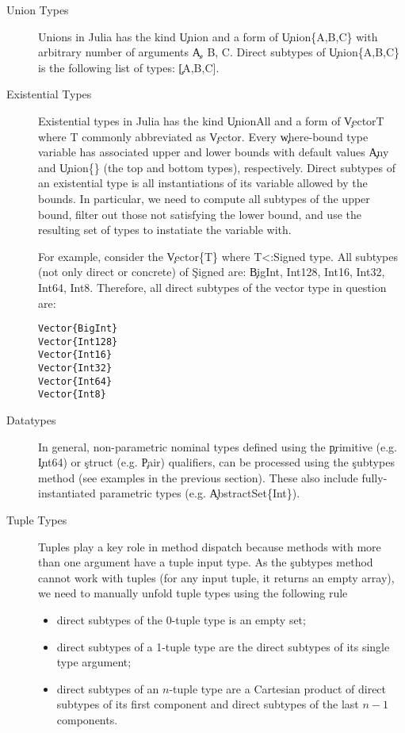 \begin{description}

  \item[Union Types]
        Unions in Julia has the kind \c{Union} and a form of \c{Union\{A,B,C\}}
        with arbitrary number of arguments \c{A, B, C}.
        Direct subtypes of \c{Union\{A,B,C\}} is the following list of types: \c{[A,B,C]}.

  \item[Existential Types]
        Existential types in Julia has the kind \c{UnionAll} and a form of
        \c{Vector{T} where T} commonly abbreviated as \c{Vector}. Every
        \c{where}-bound type variable has associated upper and lower bounds with
        default values \c{Any} and \c{Union\{\}} (the top and bottom types),
        respectively. Direct subtypes of an existential type is all
        instantiations of its variable allowed by the bounds. In particular, we
        need to compute all subtypes of the upper bound, filter out those not
        satisfying the lower bound, and use the resulting set of types to
        instatiate the variable with.

        For example, consider the \c{Vector\{T\} where T<:Signed} type.
        All subtypes (not only direct or concrete) of \c{Signed} are: \c{BigInt, Int128, Int16, Int32, Int64, Int8}. Therefore, all direct subtypes of the vector type in question are:

\begin{minipage}{.92\textwidth}
        \begin{lstlisting}
Vector{BigInt}
Vector{Int128}
Vector{Int16}
Vector{Int32}
Vector{Int64}
Vector{Int8}
        \end{lstlisting}
\end{minipage}

  \item[Datatypes]
        In general, non-parametric nominal types defined using the \c{primitive} (e.g. \c{Int64}) or
        \c{struct} (e.g. \c{Pair}) qualifiers,  can be processed
        using the \c{subtypes} method (see examples in the previous section).%
        These also include fully-instantiated parametric types
        (e.g. \c{AbstractSet\{Int\}}).

  \item[Tuple Types]
        Tuples play a key role in method dispatch because methods with
        more than one argument have a tuple input type. As the \c{subtypes} method
        cannot work with tuples (for any input tuple, it returns an empty
        array), we need to manually unfold tuple types using the following rule
        \begin{itemize}
          \item direct subtypes of the 0-tuple type is an empty set;
          \item direct subtypes of a 1-tuple type are the direct subtypes of its
          single type argument;
          \item direct subtypes of an $n$-tuple type are a Cartesian product of
          direct subtypes of its first component and direct subtypes of the last
          $n-1$ components.


\end{itemize}
\end{description}
